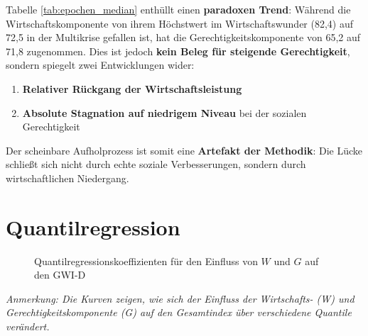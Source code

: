 Tabelle \ref{tab:epochen_median} enthüllt einen \textbf{paradoxen Trend}: Während die Wirtschaftskomponente von ihrem Höchstwert im Wirtschaftswunder (82,4) auf 72,5 in der Multikrise gefallen ist, hat die Gerechtigkeitskomponente von 65,2 auf 71,8 zugenommen. Dies ist jedoch \textbf{kein Beleg für steigende Gerechtigkeit}, sondern spiegelt zwei Entwicklungen wider:

\begin{enumerate}
	\item \textbf{Relativer Rückgang der Wirtschaftsleistung}
	\item \textbf{Absolute Stagnation auf niedrigem Niveau} bei der sozialen Gerechtigkeit
\end{enumerate}

Der scheinbare Aufholprozess ist somit eine \textbf{Artefakt der Methodik}: Die Lücke schließt sich nicht durch echte soziale Verbesserungen, sondern durch wirtschaftlichen Niedergang.

\section{Quantilregression}

\begin{figure}[ht]
  \centering
  \caption{Quantilregressionskoeffizienten für den Einfluss von \(W\) und \(G\) auf den GWI-D}
  \label{fig:quantilregression}
\end{figure}

\begin{flushleft}
\footnotesize{\textit{Anmerkung: Die Kurven zeigen, wie sich der Einfluss der Wirtschafts- (W) und Gerechtigkeitskomponente (G) auf den Gesamtindex über verschiedene Quantile verändert.}}
\end{flushleft}

